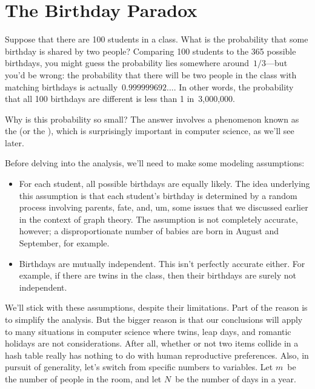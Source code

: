 \section{The Birthday Paradox}\label{birthday_principle_sec}

Suppose that there are 100 students in a class.  What is the
probability that some birthday is shared by two people?  Comparing 100
students to the 365 possible birthdays, you might guess the
probability lies somewhere around~$1/3$---but you'd be wrong: the
probability that there will be two people in the class with matching
birthdays is actually~$0.999999692\dots$.  In other words, the
probability that all 100 birthdays are different is less than 1
in~3,000,000.

Why is this probability so small?  The answer involves a phenomenon
known as the  (or the ), which is surprisingly important in computer science, as
we'll see later.

Before delving into the analysis, we'll need to make some modeling
assumptions:
\begin{itemize}

\item
For each student, all possible birthdays are equally likely.  The idea
underlying this assumption is that each student's birthday is
determined by a random process involving parents, fate, and, um, some
issues that we discussed earlier in the context of graph theory.
The assumption is not completely accurate, however; a disproportionate
number of babies are born in August and September, for example.

\item
Birthdays are mutually independent.  This isn't perfectly accurate
either.  For example, if there are twins in the class, then their
birthdays are surely not independent.

\end{itemize}
We'll stick with these assumptions, despite their limitations.  Part
of the reason is to simplify the analysis.  But the bigger reason is
that our conclusions will apply to many situations in computer science
where twins, leap days, and romantic holidays are not considerations.
After all, whether or not two items collide in a hash table really has
nothing to do with human reproductive preferences.  Also, in pursuit
of generality, let's switch from specific numbers to variables.  Let
$m$~be the number of people in the room, and let $N$~be the number of
days in a year.

